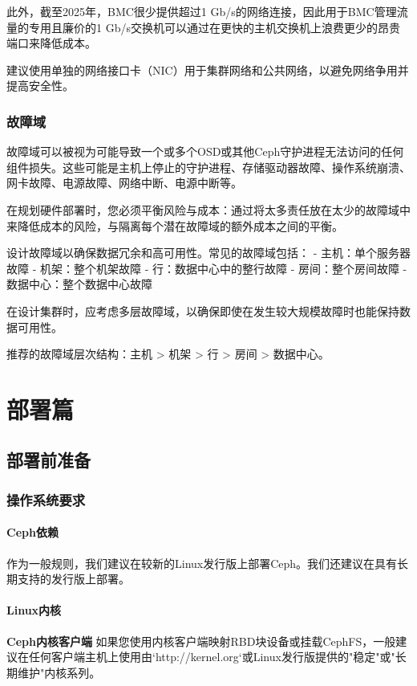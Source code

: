 \documentclass[12pt,UTF8]{ctexbook}
\begin{document}
此外，截至2025年，BMC很少提供超过1 Gb/s的网络连接，因此用于BMC管理流量的专用且廉价的1 Gb/s交换机可以通过在更快的主机交换机上浪费更少的昂贵端口来降低成本。

建议使用单独的网络接口卡（NIC）用于集群网络和公共网络，以避免网络争用并提高安全性。

\subsection{故障域}
故障域可以被视为可能导致一个或多个OSD或其他Ceph守护进程无法访问的任何组件损失。这些可能是主机上停止的守护进程、存储驱动器故障、操作系统崩溃、网卡故障、电源故障、网络中断、电源中断等。

在规划硬件部署时，您必须平衡风险与成本：通过将太多责任放在太少的故障域中来降低成本的风险，与隔离每个潜在故障域的额外成本之间的平衡。

设计故障域以确保数据冗余和高可用性。常见的故障域包括：
- 主机：单个服务器故障
- 机架：整个机架故障
- 行：数据中心中的整行故障
- 房间：整个房间故障
- 数据中心：整个数据中心故障

在设计集群时，应考虑多层故障域，以确保即使在发生较大规模故障时也能保持数据可用性。

推荐的故障域层次结构：主机 > 机架 > 行 > 房间 > 数据中心。

\chapter{部署篇}
\section{部署前准备}

\subsection{操作系统要求}
\subsubsection{Ceph依赖}
作为一般规则，我们建议在较新的Linux发行版上部署Ceph。我们还建议在具有长期支持的发行版上部署。

\subsubsection{Linux内核}
\textbf{Ceph内核客户端}
如果您使用内核客户端映射RBD块设备或挂载CephFS，一般建议在任何客户端主机上使用由`http://kernel.org`或Linux发行版提供的"稳定"或"长期维护"内核系列。
\end{document}
